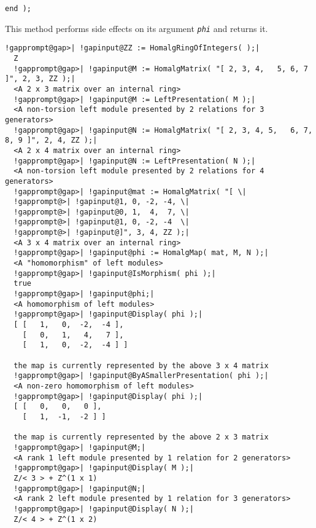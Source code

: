 \documentclass[a4paper,11pt]{report}
\begin{document}
{{{\begin{Verbatim}[fontsize=\small,frame=single,label=Code]
  end );
\end{Verbatim}
 This method performs side effects on its argument \mbox{\texttt{\mdseries\slshape phi}} and returns it. 
\begin{Verbatim}[commandchars=!@|,fontsize=\small,frame=single,label=Example]
  !gapprompt@gap>| !gapinput@ZZ := HomalgRingOfIntegers( );|
  Z
  !gapprompt@gap>| !gapinput@M := HomalgMatrix( "[ 2, 3, 4,   5, 6, 7 ]", 2, 3, ZZ );|
  <A 2 x 3 matrix over an internal ring>
  !gapprompt@gap>| !gapinput@M := LeftPresentation( M );|
  <A non-torsion left module presented by 2 relations for 3 generators>
  !gapprompt@gap>| !gapinput@N := HomalgMatrix( "[ 2, 3, 4, 5,   6, 7, 8, 9 ]", 2, 4, ZZ );|
  <A 2 x 4 matrix over an internal ring>
  !gapprompt@gap>| !gapinput@N := LeftPresentation( N );|
  <A non-torsion left module presented by 2 relations for 4 generators>
  !gapprompt@gap>| !gapinput@mat := HomalgMatrix( "[ \|
  !gapprompt@>| !gapinput@1, 0, -2, -4, \|
  !gapprompt@>| !gapinput@0, 1,  4,  7, \|
  !gapprompt@>| !gapinput@1, 0, -2, -4  \|
  !gapprompt@>| !gapinput@]", 3, 4, ZZ );|
  <A 3 x 4 matrix over an internal ring>
  !gapprompt@gap>| !gapinput@phi := HomalgMap( mat, M, N );|
  <A "homomorphism" of left modules>
  !gapprompt@gap>| !gapinput@IsMorphism( phi );|
  true
  !gapprompt@gap>| !gapinput@phi;|
  <A homomorphism of left modules>
  !gapprompt@gap>| !gapinput@Display( phi );|
  [ [   1,   0,  -2,  -4 ],
    [   0,   1,   4,   7 ],
    [   1,   0,  -2,  -4 ] ]
  
  the map is currently represented by the above 3 x 4 matrix
  !gapprompt@gap>| !gapinput@ByASmallerPresentation( phi );|
  <A non-zero homomorphism of left modules>
  !gapprompt@gap>| !gapinput@Display( phi );|
  [ [   0,   0,   0 ],
    [   1,  -1,  -2 ] ]
  
  the map is currently represented by the above 2 x 3 matrix
  !gapprompt@gap>| !gapinput@M;|
  <A rank 1 left module presented by 1 relation for 2 generators>
  !gapprompt@gap>| !gapinput@Display( M );|
  Z/< 3 > + Z^(1 x 1)
  !gapprompt@gap>| !gapinput@N;|
  <A rank 2 left module presented by 1 relation for 3 generators>
  !gapprompt@gap>| !gapinput@Display( N );|
  Z/< 4 > + Z^(1 x 2)
\end{Verbatim}
 }

 }

  }

   
\end{document}
